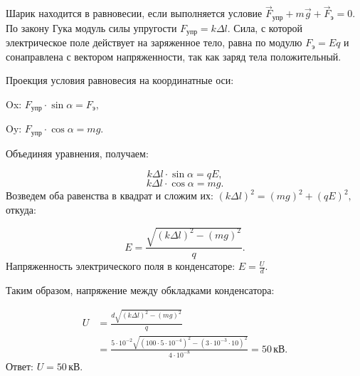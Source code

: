 \documentclass[12pt,a4paper]{article}
\begin{document}
{\begin{center}\end{center}
\par
Шарик находится в равновесии, если выполняется условие $\vec{F}_{\text{упр}} + m \vec{g} + \vec{F}_{\text{э}}=0.$ По закону Гука модуль силы упругости $F_{\text{упр}}=k\Delta l.$ Сила, с которой электрическое поле действует на заряженное тело, равна по модулю $F_{\text{э}}=Eq$ и сонаправлена с вектором напряженности, так как заряд тела положительный.\par
Проекция условия равновесия на координатные оси:\par
Ox: $F_{\text{упр}} \cdot \sin \alpha =F_{\text{э}},$\par
Oy: $F_{\text{упр}} \cdot \cos \alpha =mg.$\par
Объединяя уравнения, получаем:\par
\[k\Delta l \cdot \sin \alpha =qE,\]
\[k\Delta l \cdot \cos \alpha =mg.\]
Возведем оба равенства в квадрат и сложим их: $( k\Delta l ) ^2 = ( mg ) ^2 + ( qE ) ^2 ,$ откуда:\par
\[E= \frac{ \sqrt{( k\Delta l ) ^2 - ( mg ) ^2} }{ q } .\]
Напряженность электрического поля в конденсаторе: $E= \frac{ U}{ d } .$\par
Таким образом, напряжение между обкладками конденсатора:\par
\[\begin{aligned}U&=\frac{d\sqrt{(k\Delta l)^2-(mg)^2}}q\\&=\frac{5\cdot10^{-2}\sqrt{(100\cdot5\cdot10^{-4})^2-(3\cdot10^{-3}\cdot10)^2}}{4\cdot10^{-8}}=50\,\text{кВ}.\end{aligned}\]
Ответ: $U=50\,\text{кВ}.$\par
}
\end{document}
